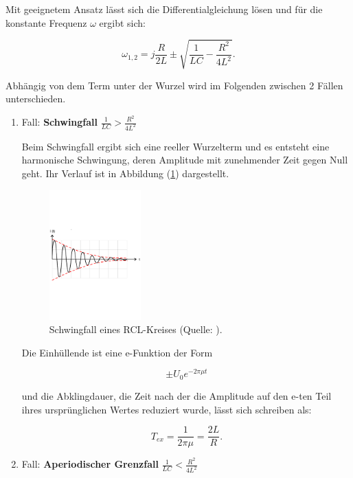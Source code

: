 \noindent
Mit geeignetem Ansatz lässt sich die Differentialgleichung lösen 
und für die konstante Frequenz $\omega$ ergibt sich:

\begin{equation}
\omega_{1,2} = j \frac{R}{2L} \pm \sqrt{\frac{1}{LC} - \frac{R^2}{4L^2}} .
\end{equation}

\noindent
Abhängig von dem Term unter der Wurzel wird im Folgenden zwischen 2 Fällen unterschieden.

\newpage
\begin{enumerate}
    \item Fall: \textbf{Schwingfall} $\frac{1}{LC} > \frac{R^2}{4L^2}$

    Beim Schwingfall ergibt sich eine reeller Wurzelterm und es entsteht eine harmonische Schwingung,
deren Amplitude mit zunehmender Zeit gegen Null geht.
Ihr Verlauf ist in Abbildung (\ref{fig:schwingfall}) dargestellt.

\begin{figure}
    \centering
       \includegraphics[height=5cm]{schwingfall.pdf}
       \caption{Schwingfall eines RCL-Kreises (Quelle: \cite{V354}).}
       \label{fig:schwingfall}
\end{figure}

Die Einhüllende ist eine e-Funktion der Form 

\begin{equation}
\pm U_0 e^{-2\pi\mu t}
\label{eqn:einh}
\end{equation}

und die Abklingdauer, die Zeit nach der die Amplitude auf den e-ten Teil ihres ursprünglichen Wertes reduziert wurde,
lässt sich schreiben als:

\begin{equation}
T_{ex} = \frac{1}{2\pi\mu} = \frac{2L}{R}.
\end{equation}

\item Fall: \textbf{Aperiodischer Grenzfall} $\frac{1}{LC} < \frac{R^2}{4L^2}$


\end{enumerate}
